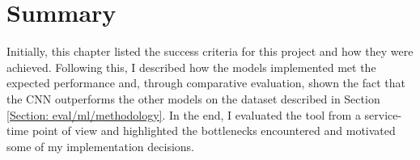 		\section{Summary} \label{Section: eval/summary}
			Initially, this chapter listed the success criteria for this project and how they were achieved. Following this, I described how the models implemented met the expected performance and, through comparative evaluation, shown the fact that the CNN outperforms the other models on the dataset described in Section \ref{Section: eval/ml/methodology}. In the end, I evaluated the tool from a service-time point of view and highlighted the bottlenecks encountered and motivated some of my implementation decisions. 
